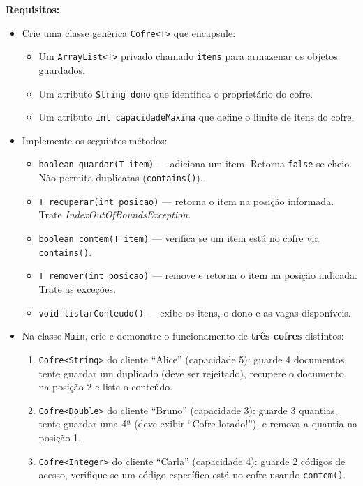 \documentclass[12pt, a4paper]{article}
\begin{document}
\textbf{Requisitos:}
\begin{itemize}
    \item Crie uma classe genérica \texttt{Cofre<T>} que encapsule:
    \begin{itemize}
        \item Um \texttt{ArrayList<T>} privado chamado \texttt{itens} para armazenar os objetos guardados.
        \item Um atributo \texttt{String dono} que identifica o proprietário do cofre.
        \item Um atributo \texttt{int capacidadeMaxima} que define o limite de itens do cofre.
    \end{itemize}
    \item Implemente os seguintes métodos:
    \begin{itemize}
        \item \texttt{boolean guardar(T item)} — adiciona um item. Retorna \texttt{false} se cheio. Não permita duplicatas (\texttt{contains()}).
        \item \texttt{T recuperar(int posicao)} — retorna o item na posição informada. Trate \textit{IndexOutOfBoundsException}.
        \item \texttt{boolean contem(T item)} — verifica se um item está no cofre via \texttt{contains()}.
        \item \texttt{T remover(int posicao)} — remove e retorna o item na posição indicada. Trate as exceções.
        \item \texttt{void listarConteudo()} — exibe os itens, o dono e as vagas disponíveis.
    \end{itemize}
    \item Na classe \texttt{Main}, crie e demonstre o funcionamento de \textbf{três cofres} distintos:
    \begin{enumerate}
        \item \texttt{Cofre<String>} do cliente ``Alice'' (capacidade 5): guarde 4 documentos, tente guardar um duplicado (deve ser rejeitado), recupere o documento na posição 2 e liste o conteúdo.
        \item \texttt{Cofre<Double>} do cliente ``Bruno'' (capacidade 3): guarde 3 quantias, tente guardar uma 4ª (deve exibir ``Cofre lotado!''), e remova a quantia na posição 1.
        \item \texttt{Cofre<Integer>} do cliente ``Carla'' (capacidade 4): guarde 2 códigos de acesso, verifique se um código específico está no cofre usando \texttt{contem()}.
    \end{enumerate}
\end{itemize}
\end{document}
